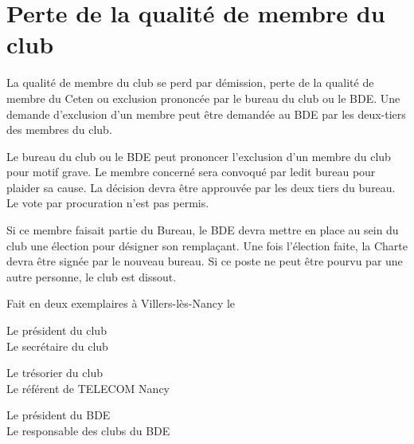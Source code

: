 \documentclass{article}
\begin{document}
\begin{multicols}{2}
{		}
		
		\section{Perte de la qualité de membre du club}

		{\small

			La qualité de membre du club se perd par démission, perte
			de la qualité de membre du Ceten ou exclusion prononcée
			par le bureau du club ou le BDE\@. Une demande d’exclusion
			d’un membre peut être demandée au BDE par les deux-tiers
			des membres du club.

			Le bureau du club ou le BDE peut prononcer l’exclusion d’un
			membre du club pour motif grave. Le membre concerné
			sera convoqué par ledit bureau pour plaider sa cause. La
			décision devra être approuvée par les deux tiers du bureau.
			Le vote par procuration n’est pas permis.

			Si ce membre faisait partie du Bureau, le BDE devra mettre
			en place au sein du club une élection pour désigner son
			remplaçant. Une fois l’élection faite, la Charte devra être
			signée par le nouveau bureau. Si ce poste ne peut être
			pourvu par une autre personne, le club est dissout.

		}
		
	\end{multicols}

	\vfill
	Fait en deux exemplaires à Villers-lès-Nancy le \underline{\hspace{5cm}}
	\vfill

	\begin{multicols}{2}
		Le président du club \\
		Le secrétaire du club 
	\end{multicols}
		\vspace*{4cm}
	\begin{multicols}{2}
		Le trésorier du club \\
		Le référent de TELECOM Nancy 
	\end{multicols}
		\vspace*{4cm}
	\begin{multicols}{2}
		Le président du BDE \\
		Le responsable des clubs du BDE 
	\end{multicols}
		\vspace*{4cm}
\end{document}

